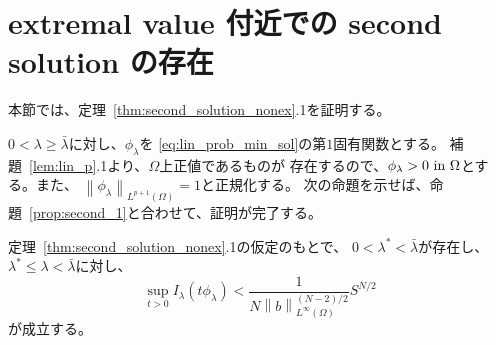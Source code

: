  \section{extremal value 付近での second solution の存在} \label{sec:exist}
 
 本節では、定理~\ref{thm:second_solution_nonex}.1を証明する。
 
 $0 < \lambda \geq \bar{\lambda}$に対し、$\phi_\lambda$を
 \eqref{eq:lin_prob_min_sol}の第$1$固有関数とする。
 補題~\ref{lem:lin_p}.1より、$\Omega$上正値であるものが
 存在するので、$\phi_\lambda > 0 ~\text{in}~ \Omega$とする。また、
 $\left\| \phi_\lambda \right\|_{L^{p+1}(\Omega)} = 1$と正規化する。
 次の命題を示せば、命題~\ref{prop:second_1}と合わせて、証明が完了する。
 
\begin{prop} \label{prop:exist}
 定理~\ref{thm:second_solution_nonex}.1の仮定のもとで、
 $0 < \lambda^* < \bar{\lambda}$が存在し、
 $\lambda^* \leq \lambda < \bar{\lambda}$に対し、
 \begin{equation}
  \sup_{t > 0} I_\lambda(t \phi_\lambda) < \frac{1}{N \left\| b
                                                                                            \right\|_{L^\infty(\Omega)}^{(N-2)/2}}
  S^{N/2} \label{eq:exist_S}
 \end{equation}
 が成立する。
\end{prop}


